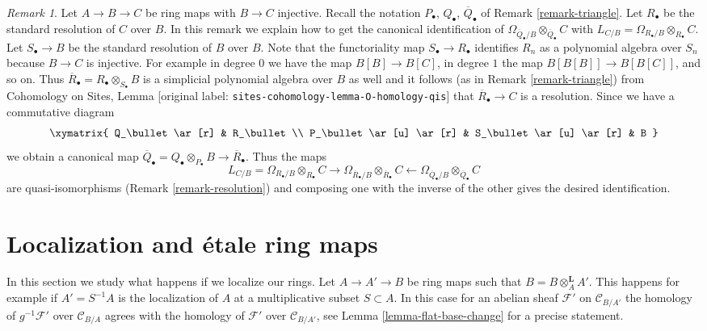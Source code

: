 \documentclass[10pt,a4paper]{article}
\theoremstyle{plain}
\theoremstyle{definition}
\theoremstyle{remark}
\newtheorem{remark}[subsection]{Remark}
\numberwithin{equation}{subsection}
\begin{document}
\begin{remark}
\label{remark-explicit-map}
Let $A \to B \to C$ be ring maps with $B \to C$ injective.
Recall the notation $P_\bullet$, $Q_\bullet$, $\overline{Q}_\bullet$ of
Remark \ref{remark-triangle}.
Let $R_\bullet$ be the standard resolution of $C$ over $B$.
In this remark we explain how to get the canonical identification
of $\Omega_{\overline{Q}_\bullet/B} \otimes_{\overline{Q}_\bullet} C$
with $L_{C/B} = \Omega_{R_\bullet/B} \otimes_{R_\bullet} C$.
Let $S_\bullet \to B$ be the standard resolution of $B$ over $B$.
Note that the functoriality map $S_\bullet \to R_\bullet$ identifies
$R_n$ as a polynomial algebra over $S_n$ because $B \to C$ is injective.
For example in degree $0$ we have the map $B[B] \to B[C]$, in degree
$1$ the map $B[B[B]] \to B[B[C]]$, and so on. Thus
$\overline{R}_\bullet = R_\bullet \otimes_{S_\bullet} B$
is a simplicial polynomial algebra
over $B$ as well and it follows (as in Remark \ref{remark-triangle}) from
Cohomology on Sites, Lemma
\textnormal{[original label: \nolinkurl{sites-cohomology-lemma-O-homology-qis}]}
that $\overline{R}_\bullet \to C$ is a resolution. Since we have
a commutative diagram
$$
\xymatrix{
Q_\bullet \ar[r] & R_\bullet \\
P_\bullet \ar[u] \ar[r] & S_\bullet \ar[u] \ar[r] & B
}
$$
we obtain a canonical map
$\overline{Q}_\bullet = Q_\bullet \otimes_{P_\bullet} B \to
\overline{R}_\bullet$. Thus the maps
$$
L_{C/B} = \Omega_{R_\bullet/B} \otimes_{R_\bullet} C
\longrightarrow
\Omega_{\overline{R}_\bullet/B} \otimes_{\overline{R}_\bullet} C
\longleftarrow
\Omega_{\overline{Q}_\bullet/B} \otimes_{\overline{Q}_\bullet} C
$$
are quasi-isomorphisms (Remark \ref{remark-resolution}) and composing
one with the inverse of the other gives the desired identification.
\end{remark}





\section{Localization and \'etale ring maps}
\label{section-localization}

\noindent
In this section we study what happens if we localize our rings.
Let $A \to A' \to B$ be ring maps such that $B = B \otimes_A^\mathbf{L} A'$.
This happens for example if $A' = S^{-1}A$ is the localization of $A$
at a multiplicative subset $S \subset A$. In this
case for an abelian sheaf $\mathcal{F}'$ on $\mathcal{C}_{B/A'}$
the homology of $g^{-1}\mathcal{F}'$ over $\mathcal{C}_{B/A}$ agrees with
the homology of $\mathcal{F}'$ over $\mathcal{C}_{B/A'}$, see
Lemma \ref{lemma-flat-base-change} for a precise statement.
\end{document}
